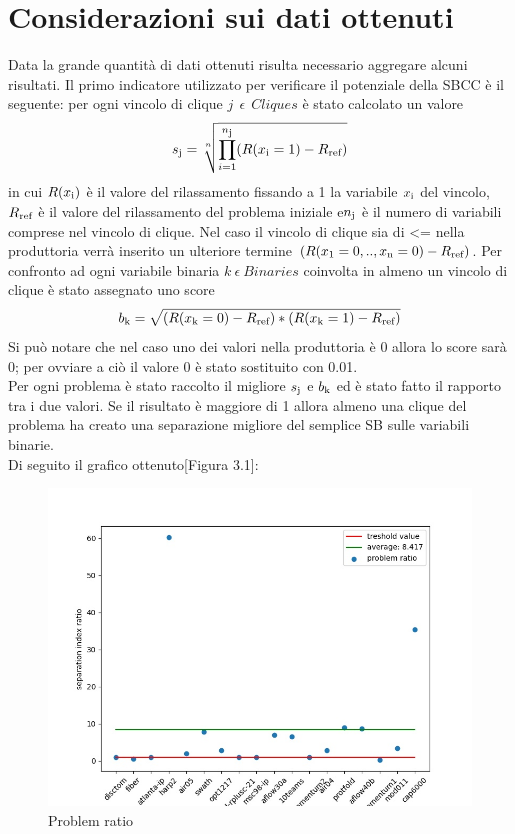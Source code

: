 \documentclass[12pt,a4paper,twoside,openright]{book}
\begin{document}
\section{Considerazioni sui dati ottenuti}
Data la grande quantità di dati ottenuti risulta necessario aggregare alcuni risultati. Il primo indicatore
utilizzato per verificare il potenziale della SBCC è il seguente: per ogni vincolo di clique 
$j\:\:\epsilon\:\:Cliques$ è stato calcolato un valore
\[ s\textsubscript{j} = \sqrt[n]{\prod_{i=1}^{n\textsubscript{j}} (R(x\textsubscript{i}=1)-R\textsubscript{ref}) }\] 
in cui $R(x\textsubscript{i})$ è il valore del rilassamento fissando a 1 la variabile $x\textsubscript{i}$
del vincolo, $R\textsubscript{ref}$ è il valore del rilassamento del problema iniziale e$n\textsubscript{j}$ è il 
numero di variabili comprese nel vincolo di clique. Nel caso il vincolo di clique sia di <= nella 
produttoria verrà inserito un ulteriore termine $(R(x\textsubscript{1}=0, .., x\textsubscript{n}=0)- R\textsubscript{ref})$.
Per confronto ad ogni variabile binaria $k\:\epsilon\:Binaries$ coinvolta in almeno un vincolo di clique è stato assegnato uno score
\[ b\textsubscript{k} = \sqrt{(R(x\textsubscript{k}=0)-R\textsubscript{ref})*(R(x\textsubscript{k}=1)-R\textsubscript{ref})}\] 
Si può notare che nel caso uno dei valori nella produttoria è 0 allora lo score sarà 0; per ovviare a ciò il 
valore 0 è stato sostituito con 0.01.\\
Per ogni problema è stato raccolto il migliore $s\textsubscript{j}$ e $b\textsubscript{k}$ ed è stato fatto il rapporto
tra i due valori. Se il risultato è maggiore di 1 allora almeno una clique del problema ha creato una separazione migliore del semplice SB
sulle variabili binarie.\\
Di seguito il grafico ottenuto[Figura 3.1]:
\begin{figure}[ht]
    \centering
    \includegraphics [scale = 0.7]{chart_agg}
    \caption{Problem ratio}
    \label{fig:ratio}
\end{figure}
\end{document}
